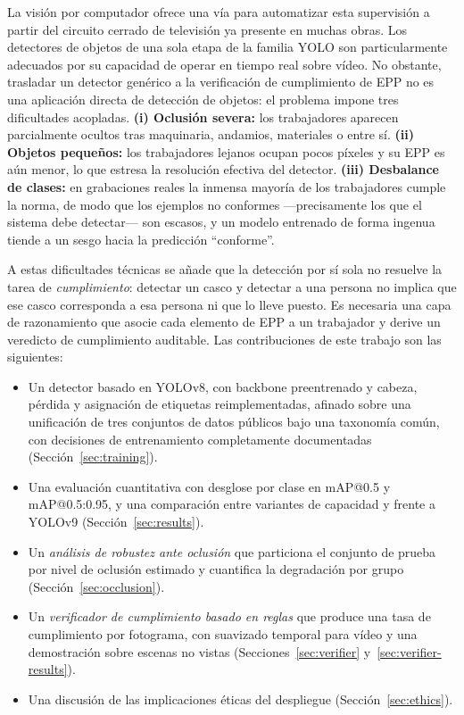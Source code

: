 \documentclass{article}
\begin{document}
La visión por computador ofrece una vía para automatizar esta supervisión a
partir del circuito cerrado de televisión ya presente en muchas obras. Los
detectores de objetos de una sola etapa de la familia YOLO
\citep{redmon2016yolo,jocher2023yolov8,wang2024yolov9} son particularmente
adecuados por su capacidad de operar en tiempo real sobre vídeo. No obstante,
trasladar un detector genérico a la verificación de cumplimiento de EPP no es
una aplicación directa de detección de objetos: el problema impone tres
dificultades acopladas. \textbf{(i) Oclusión severa:} los trabajadores
aparecen parcialmente ocultos tras maquinaria, andamios, materiales o entre
sí. \textbf{(ii) Objetos pequeños:} los trabajadores lejanos ocupan pocos
píxeles y su EPP es aún menor, lo que estresa la resolución efectiva del
detector. \textbf{(iii) Desbalance de clases:} en grabaciones reales la
inmensa mayoría de los trabajadores cumple la norma, de modo que los ejemplos
no conformes —precisamente los que el sistema debe detectar— son escasos, y un
modelo entrenado de forma ingenua tiende a un sesgo hacia la predicción
``conforme''.

A estas dificultades técnicas se añade que la detección por sí sola no resuelve
la tarea de \emph{cumplimiento}: detectar un casco y detectar a una persona no
implica que ese casco corresponda a esa persona ni que lo lleve puesto. Es
necesaria una capa de razonamiento que asocie cada elemento de EPP a un
trabajador y derive un veredicto de cumplimiento auditable. Las contribuciones
de este trabajo son las siguientes:

\begin{itemize}[leftmargin=1.4em,itemsep=2pt,topsep=2pt]
  \item Un detector basado en YOLOv8, con backbone preentrenado y cabeza,
  pérdida y asignación de etiquetas reimplementadas, afinado sobre una
  unificación de tres conjuntos de datos públicos bajo una taxonomía común,
  con decisiones de entrenamiento completamente documentadas
  (Sección~\ref{sec:training}).
  \item Una evaluación cuantitativa con desglose por clase en mAP@0.5 y
  mAP@0.5:0.95, y una comparación entre variantes de capacidad y frente a
  YOLOv9 (Sección~\ref{sec:results}).
  \item Un \emph{análisis de robustez ante oclusión} que particiona el conjunto
  de prueba por nivel de oclusión estimado y cuantifica la degradación por
  grupo (Sección~\ref{sec:occlusion}).
  \item Un \emph{verificador de cumplimiento basado en reglas} que produce una
  tasa de cumplimiento por fotograma, con suavizado temporal para vídeo y una
  demostración sobre escenas no vistas (Secciones~\ref{sec:verifier}
  y~\ref{sec:verifier-results}).
  \item Una discusión de las implicaciones éticas del despliegue
  (Sección~\ref{sec:ethics}).
\end{itemize}
\end{document}
